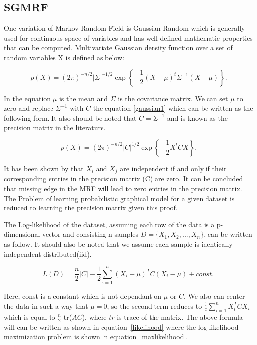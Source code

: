 \documentclass{article} %
\begin{document}
\subsection{SGMRF}
One variation of Markov Random Field is Gaussian Random which is generally 
used for continuous space of variables and has well-defined mathematic 
properties that can be computed. Multivariate Gaussian density function 
over a set of random variables X is defined as below: 

\begin{equation}\label{gaussian1}
p(X) = (2\pi)^{-n/2} |\Sigma|^{-1/2} \exp\left\{ -\frac{1}{2}(X - \mu)^t \Sigma^{-1} (X - \mu) \right\}.
\end{equation}
 
In the equation $\mu$ is the mean and $\Sigma$ is the covariance matrix. 
We can set $\mu$ to zero and replace $\Sigma^{-1}$ with $C$ the 
equation \eqref{gaussian1} which can be written as the following form. 
It also should be noted that $C = \Sigma^{-1}$ and is known as the 
precision matrix in the literature.  

\begin{equation}\label{gaussian2}
p(X) = (2\pi)^{-n/2} |C|^{1/2} \exp\left\{ -\frac{1}{2}X^t C X \right\}.
\end{equation}

It has been shown by \cite{lauritzen1996graphical} that $X_i$ and $X_j$ are 
independent if and only if their corresponding entries in the precision 
matrix (C) are zero. It can be concluded that missing edge in the MRF will 
lead to zero entries in the precision matrix\cite{Rish2014Book}. The Problem 
of learning probabilistic graphical model for a given dataset is reduced to 
learning the precision matrix given this proof.

The Log-likelihood of the dataset, assuming each row of the data is a
p-dimensional vector and consisting n samples $D = \{X_1, X_2, ... , X_n\}$, 
can be written as follow. It should also be noted that we assume each sample 
is identically independent distributed(iid).

\begin{equation}
L(D) = \frac{n}{2} |C| - \frac{1}{2} \sum_{i=1}^{n} (X_i - \mu )^T C (X_i - \mu ) + const,
\end{equation}  

Here, const is a constant which is not dependant on $\mu$ or $C$. We also can 
center the data in such a way that $\mu = 0$, so the second term reduces to 
$\frac{1}{2} \sum_{i=1}^{n} X_i ^T C X_i$ which is equal to 
$\frac{n}{2}$ tr($AC$), where $tr$ is trace of the matrix. The above 
formula will can be written as shown in equation~\eqref{likelihood} where the
log-likelihood maximization problem is shown in 
equation~\eqref{maxlikelihood}. 
\end{document}

